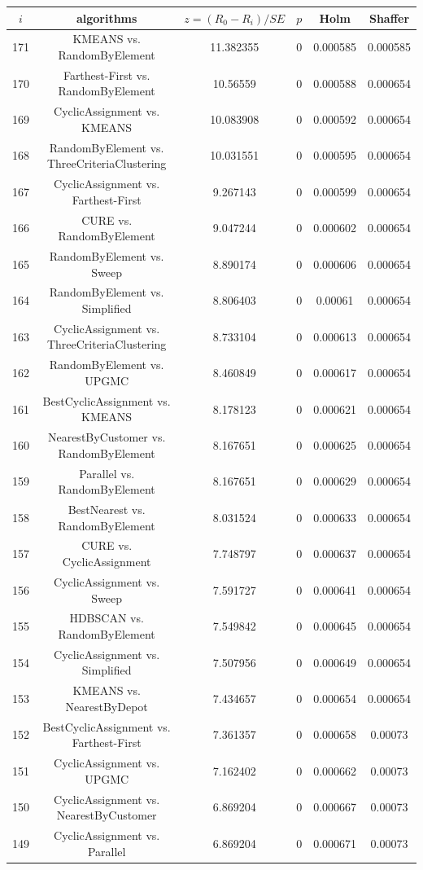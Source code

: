 \documentclass[a4paper,10pt]{article}
\begin{document}
\begin{landscape}
\begin{table}[!htp]
\centering\scriptsize
\begin{tabular}{cccccc}
$i$&algorithms&$z=(R_0 - R_i)/SE$&$p$&Holm&Shaffer\\
\hline171&KMEANS vs. RandomByElement&11.382355&0&0.000585&0.000585\\
170&Farthest-First vs. RandomByElement&10.56559&0&0.000588&0.000654\\
169&CyclicAssignment vs. KMEANS&10.083908&0&0.000592&0.000654\\
168&RandomByElement vs. ThreeCriteriaClustering&10.031551&0&0.000595&0.000654\\
167&CyclicAssignment vs. Farthest-First&9.267143&0&0.000599&0.000654\\
166&CURE vs. RandomByElement&9.047244&0&0.000602&0.000654\\
165&RandomByElement vs. Sweep&8.890174&0&0.000606&0.000654\\
164&RandomByElement vs. Simplified&8.806403&0&0.00061&0.000654\\
163&CyclicAssignment vs. ThreeCriteriaClustering&8.733104&0&0.000613&0.000654\\
162&RandomByElement vs. UPGMC&8.460849&0&0.000617&0.000654\\
161&BestCyclicAssignment vs. KMEANS&8.178123&0&0.000621&0.000654\\
160&NearestByCustomer vs. RandomByElement&8.167651&0&0.000625&0.000654\\
159&Parallel vs. RandomByElement&8.167651&0&0.000629&0.000654\\
158&BestNearest vs. RandomByElement&8.031524&0&0.000633&0.000654\\
157&CURE vs. CyclicAssignment&7.748797&0&0.000637&0.000654\\
156&CyclicAssignment vs. Sweep&7.591727&0&0.000641&0.000654\\
155&HDBSCAN vs. RandomByElement&7.549842&0&0.000645&0.000654\\
154&CyclicAssignment vs. Simplified&7.507956&0&0.000649&0.000654\\
153&KMEANS vs. NearestByDepot&7.434657&0&0.000654&0.000654\\
152&BestCyclicAssignment vs. Farthest-First&7.361357&0&0.000658&0.00073\\
151&CyclicAssignment vs. UPGMC&7.162402&0&0.000662&0.00073\\
150&CyclicAssignment vs. NearestByCustomer&6.869204&0&0.000667&0.00073\\
149&CyclicAssignment vs. Parallel&6.869204&0&0.000671&0.00073\\

\end{tabular}
\end{table}
\end{landscape}
\end{document}
